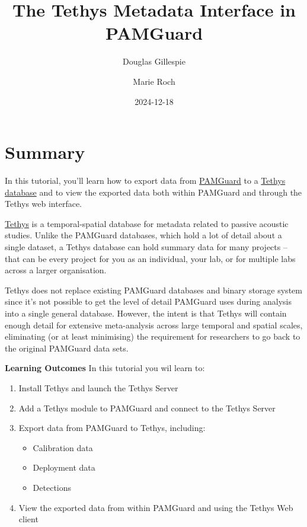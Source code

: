 \documentclass[
]{article}
\title{The Tethys Metadata Interface in PAMGuard}
\author[1]{Douglas Gillespie}
\author[2]{Marie Roch}
\affil[1]{Sea Mammal Research Unit, University of St Andrews}
\affil[2]{San Diego State University, CA}
\date{2024-12-18}
\renewcommand*\contentsname{Table of contents}
\newcommand\contentsname{Table of contents}
\begin{document}
\maketitle

\section{Summary}
In this tutorial, you'll learn how to export data from \href{https://www.pamguard.org}{PAMGuard}  to a \href{https://tethys.sdsu.edu}{Tethys database}  and to view the exported data both within PAMGuard and through the Tethys web interface.

\href{https://tethys.sdsu.edu}{Tethys} is a temporal-spatial database for metadata related to passive     acoustic studies. Unlike the PAMGuard databases, which hold a lot of detail about a single dataset, a Tethys database can hold summary data for many projects -- that can be every project for you as an individual, your lab, or for multiple labs across a larger organisation.

Tethys does not replace existing PAMGuard databases and binary storage system since it's not possible to get the level of detail PAMGuard uses during analysis into a single general database. However, the intent is that Tethys will contain enough detail for extensive meta-analysis across large temporal and spatial scales, eliminating (or at least minimising) the requirement for researchers to go back to the original PAMGuard data sets.

\textbf{Learning Outcomes}
In this tutorial you wil learn to:
\begin{enumerate}
\item Install Tethys and launch the Tethys Server
\item Add a Tethys module to PAMGuard and connect to the Tethys Server
\item Export data from PAMGuard to Tethys, including:
\begin{itemize}
\item Calibration data
\item Deployment data
\item Detections
\end{itemize}
\item View the exported data from within PAMGuard and using the Tethys Web client
\end{enumerate}
\newpage

\renewcommand*\contentsname{Table of contents}
{
\hypersetup{linkcolor=}
\setcounter{tocdepth}{3}
\tableofcontents
}
\end{document}
